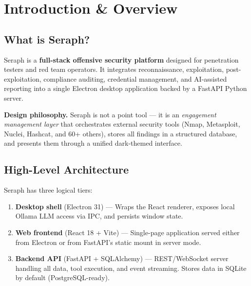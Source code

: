 \documentclass[11pt,a4paper,twoside,openright]{book}
\begin{document}
\frontmatter
\tableofcontents
\listoftables

\mainmatter

\chapter{Introduction \& Overview}

\section{What is Seraph?}

Seraph is a \textbf{full-stack offensive security platform} designed for penetration testers and red team operators. It integrates reconnaissance, exploitation, post-exploitation, compliance auditing, credential management, and AI-assisted reporting into a single Electron desktop application backed by a FastAPI Python server.

\begin{notebox}
\textbf{Design philosophy.} Seraph is not a point tool — it is an \emph{engagement management layer} that orchestrates external security tools (Nmap, Metasploit, Nuclei, Hashcat, and 60+ others), stores all findings in a structured database, and presents them through a unified dark-themed interface.
\end{notebox}

\section{High-Level Architecture}

Seraph has three logical tiers:

\begin{enumerate}[leftmargin=*]
  \item \textbf{Desktop shell} (Electron 31) — Wraps the React renderer, exposes local Ollama LLM access via IPC, and persists window state.
  \item \textbf{Web frontend} (React 18 + Vite) — Single-page application served either from Electron or from FastAPI's static mount in server mode.
  \item \textbf{Backend API} (FastAPI + SQLAlchemy) — REST/WebSocket server handling all data, tool execution, and event streaming. Stores data in SQLite by default (PostgreSQL-ready).
\end{enumerate}
\end{document}

